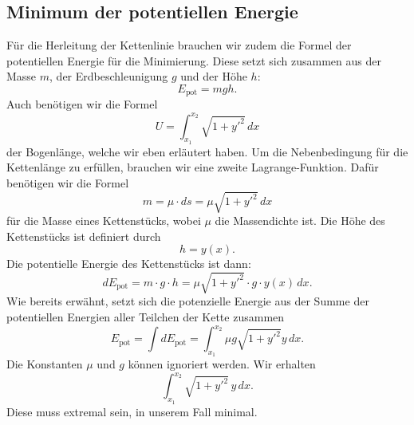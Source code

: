 \subsection{Minimum der potentiellen Energie
\label{kettenlinie:subsection:Minimum der potentiellen Energie}}
Für die Herleitung der Kettenlinie brauchen wir zudem die Formel der potentiellen Energie für die Minimierung. Diese setzt sich zusammen aus der Masse \(m\), der Erdbeschleunigung \(g\) und der Höhe \(h\):
\begin{equation}
	E_{\text{pot}}
	=
	mgh.
\end{equation}
Auch benötigen wir die Formel 
\begin{equation}
	U
	=
	\int_{x_1}^{x_2} \sqrt{1 + y'^2} \, dx
\end{equation}
der Bogenlänge, welche wir eben erläutert haben.
Um die Nebenbedingung für die Kettenlänge zu erfüllen, brauchen wir eine zweite Lagrange-Funktion.
Dafür benötigen wir die Formel
\begin{equation}
	m = \mu \cdot ds = \mu \sqrt{1 + y'^2} \, dx
\end{equation}
für die Masse eines Kettenstücks, wobei \(\mu\) die Massendichte ist.
Die Höhe des Kettenstücks ist definiert durch
\begin{equation}
	h = y(x).
\end{equation}
Die potentielle Energie des Kettenstücks ist dann:
\begin{equation}
	dE_{\text{pot}} = m \cdot g \cdot h = \mu \sqrt{1 + y'^2} \cdot g \cdot y(x) \, dx.
\end{equation}
Wie bereits erwähnt, setzt sich die potenzielle Energie aus der Summe der potentiellen Energien aller Teilchen der Kette zusammen
\begin{equation}
	E_{\text{pot}} = \int dE_{\text{pot}} = \int_{x_1}^{x_2} \mu g \sqrt{1 + y'^2} y  \, dx.
\end{equation}
Die Konstanten \(\mu\) und \(g\) können ignoriert werden.
Wir erhalten
\begin{equation}
	\int_{x_1}^{x_2} \sqrt{1 + y'^2} \, y \, dx.
\end{equation}
Diese muss extremal sein, in unserem Fall minimal.

